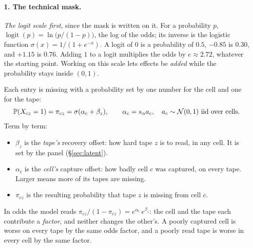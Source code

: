 \paragraph{1. The technical mask.} \emph{The logit scale first,} since the mask is written on it. For
a probability $p$, $\operatorname{logit}(p)=\ln\!\big(p/(1-p)\big)$, the log of the odds; its inverse
is the logistic function $\sigma(x)=1/(1+e^{-x})$. A logit of $0$ is a probability of $0.5$, $-0.85$
is $0.30$, and $+1.15$ is $0.76$. Adding $1$ to a logit multiplies the odds by $e\approx2.72$, whatever
the starting point. Working on this scale lets effects be \emph{added} while the probability stays
inside $(0,1)$.

Each entry is missing with a probability set by one number for the cell and one for the tape:
\begin{equation}
  \mathbb{P}(X_{cz}=1)=\pi_{cz}=\sigma(\alpha_c+\beta_z),
  \qquad \alpha_c=s_\alpha a_c,\quad a_c\sim\mathcal N(0,1)\ \text{iid over cells.}
  \label{eq:mask}
\end{equation}
Term by term:
\begin{itemize}
  \item $\beta_z$ is the \emph{tape's} recovery offset: how hard tape $z$ is to read, in any cell. It
        is set by the panel (\S\ref{sec:latent}).
  \item $\alpha_c$ is the \emph{cell's} capture offset: how badly cell $c$ was captured, on every tape.
        Larger means more of its tapes are missing.
  \item $\pi_{cz}$ is the resulting probability that tape $z$ is missing from cell $c$.
\end{itemize}
In odds the model reads $\pi_{cz}/(1-\pi_{cz})=e^{\alpha_c}\,e^{\beta_z}$: the cell and the tape each
contribute a \emph{factor}, and neither changes the other's. A poorly captured cell is worse on every
tape by the same odds factor, and a poorly read tape is worse in every cell by the same factor.

